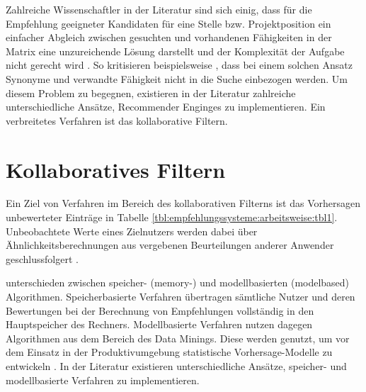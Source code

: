 Zahlreiche Wissenschaftler in der Literatur sind sich einig, dass für die Empfehlung geeigneter Kandidaten für eine Stelle bzw. Projektposition ein einfacher Abgleich zwischen gesuchten und vorhandenen Fähigkeiten in der Matrix eine unzureichende Lösung darstellt \cite[S. 1]{enhancingERecruitment:2012}\cite[S. 1]{faerber:2003}\cite[S. 2]{prospect:2010} und der Komplexität der Aufgabe nicht gerecht wird \cite[S. 1]{malinowski:2008}. So kritisieren beispielsweise \textcite[S. 1f.]{mitre:2014}, dass bei einem solchen Ansatz Synonyme und verwandte Fähigkeit nicht in die Suche einbezogen werden. Um diesem Problem zu begegnen, existieren in der Literatur zahlreiche unterschiedliche Ansätze, Recommender Enginges zu implementieren. Ein verbreitetes Verfahren ist das kollaborative Filtern.

\section{Kollaboratives Filtern}
\label{ch:empfehlungssysteme:cf}
Ein Ziel von Verfahren im Bereich des kollaborativen Filterns ist das Vorhersagen unbewerteter Einträge in Tabelle \ref{tbl:empfehlungssysteme:arbeitsweise:tbl1}. Unbeobachtete Werte eines Zielnutzers werden dabei über Ähnlichkeitsberechnungen aus vergebenen Beurteilungen anderer Anwender geschlussfolgert \cite[S. 1]{su:2009}.

\textcite[S. 3]{breese:1998} unterschieden zwischen speicher- (memory-) und modellbasierten (modelbased) Algorithmen. Speicherbasierte Verfahren übertragen sämtliche Nutzer und deren Bewertungen bei der Berechnung von Empfehlungen vollständig in den Hauptspeicher des Rechners. Modellbasierte Verfahren nutzen dagegen Algorithmen aus dem Bereich des Data Minings. Diese werden genutzt, um vor dem Einsatz in der Produktivumgebung statistische Vorhersage-Modelle zu entwickeln \cite[S. 3]{breese:1998}\cite[S. 11]{schafer:2007}. In der Literatur existieren unterschiedliche Ansätze, speicher- und modellbasierte Verfahren zu implementieren.

